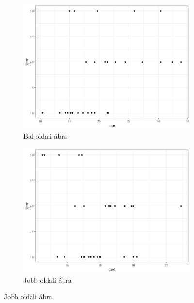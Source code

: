 \documentclass[
]{article}
\begin{document}
\begin{figure}[h]
\begin{multicols}{2}
\begin{figure}[H]
\includegraphics[width = \linewidth]{cookbook_files/figure-latex/gear-fig1-1}
\caption{Bal oldali ábra}
\label{fig:bar2_a4}
\end{figure}

\columnbreak

\begin{figure}[H]
\includegraphics[width = \linewidth]{cookbook_files/figure-latex/gear-fig1-2}
\centering
\caption{Jobb oldali ábra}
\label{fig:bar2_b4}
\end{figure}
\end{multicols}
\end{figure}
\end{document}
